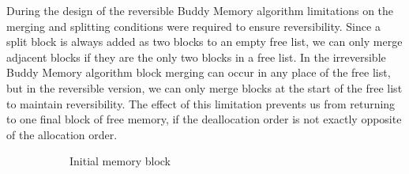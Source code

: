 During the design of the reversible Buddy Memory algorithm limitations on the merging and splitting conditions were required to ensure reversibility. Since a split block is always added as two blocks to an empty free list, we can only merge adjacent blocks if they are the only two blocks in a free list. In the irreversible Buddy Memory algorithm block merging can occur in any place of the free list, but in the reversible version, we can only merge blocks at the start of the free list to maintain reversibility. The effect of this limitation prevents us from returning to one final block of free memory, if the deallocation order is not exactly opposite of the allocation order.

\begin{figure}[ht]
    \centering
    \begin{subfigure}{.5\textwidth}
        \centering
        \caption{\footnotesize Initial memory block}
    \end{subfigure}%
    \begin{subfigure}{.5\textwidth}
        \centering
\end{subfigure}
\end{figure}
